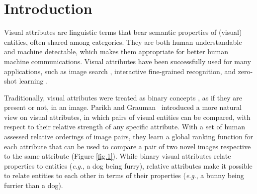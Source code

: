 \documentclass[runningheads]{llncs}
\newcommand{\eg}{\textit{e}.\textit{g}.}
\begin{document}
\section{Introduction}

Visual attributes are linguistic terms that bear semantic properties of (visual) entities, often shared among categories. They are both human understandable and machine detectable, which makes them appropriate for better human machine communications. Visual attributes have been successfully used for many applications, such as image search \cite{whittlesearch}, interactive fine-grained recognition, \cite{branson13,branson10} and zero-shot learning \cite{6571196,parikh2011}. 

Traditionally, visual attributes were treated as binary concepts \cite{ferrari2007learning,Farhadi09describingobjects}, as if they are present or not, in an image. Parikh and Grauman~\cite{parikh2011} introduced a more natural view on visual attributes, in which pairs of visual entities can be compared, with respect to their relative strength of any specific attribute. With a set of human assessed relative orderings of image pairs, they learn a global ranking function for each attribute that can be used to compare a pair of two novel images respective to the same attribute (Figure \ref{fig.1}).
While binary visual attributes relate properties to entities (\eg, a dog being furry), relative attributes make it possible to relate entities to each other in terms of their properties (\eg, a bunny being furrier than a dog).
\end{document}
